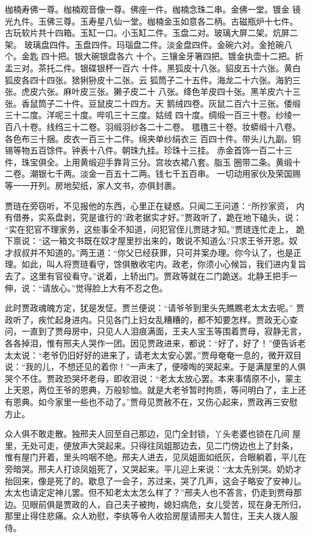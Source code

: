 枷楠寿佛一尊。枷楠观音像一尊。佛座一件。枷楠念珠二串。金佛一堂。镀金
镜光九件。玉佛三尊。玉寿星八仙一堂。枷楠金玉如意各二柄。古磁瓶炉十七件。
古玩软片共十四箱。玉缸一口。小玉缸二件。玉盘二对。玻璃大屏二架。炕屏二架。
玻璃盘四件。玉盘四件。玛瑙盘二件。淡金盘四件。金碗六对。金抢碗八个。金匙
四十把。银大碗银盘各六
十个。三镶金牙箸四把。镀金执壶十二把。折盂三对。茶托二件。银碟银杯一百六
十件。黑狐皮十八张。貂皮五十六张。黄白狐皮各四十四张。猞猁狲皮十二张。云
狐筒子二十五件。海龙二十六张。海豹三张。虎皮六张。麻叶皮三张。獭子皮二十
八张。绛色羊皮四十张。黑羊皮六十三张。香鼠筒子二十件。豆鼠皮二十四方。天
鹅绒四卷。灰鼠二百六十三张。倭缎三十二度。洋呢三十度。哔叽三十三度。姑绒
四十度。绸缎一百三十卷。纱绫一百八十卷。线绉三十二卷。羽缎羽纱各二十二卷。
氆氇三十卷。妆蟒缎十八卷。各色布三十捆。皮衣一百三十二件。绵夹单纱绢衣三
百四十件。带头儿九副。铜锡等物五百馀件。钟表十八件。朝珠九挂。珍珠十三挂。
赤金首饰一百二十三件，珠宝俱全。上用黄缎迎手靠背三分。宫妆衣裙八套。脂玉
圈带二条。黄缎十二卷。潮银七千两。淡金一百五十二两。钱七千五百串。
一切动用家伙及荣国赐等一一开列。房地契纸，家人文书，亦俱封裹。

贾琏在旁窃听，不见报他的东西，心里正在疑惑。只闻二王问道：“所抄家资，
内有借券，实系盘剥，究是谁行的?政老据实才好。”贾政听了，跪在地下磕头，说：
“实在犯官不理家务，这些事全不知道，问犯官侄儿贾琏才知。”贾琏连忙走上，
跪下禀说：“这一箱文书既在奴才屋里抄出来的，敢说不知道么?只求王爷开恩。奴
才叔叔并不知道的。”两王道：“你父已经获罪，只可并案办理。你今认了，也是正
理。如此，叫人将贾琏看守，馀俱散收宅内。政老，你须小心候旨，我们进内复旨
去了。这里有官役看守。”说着，上轿出门。贾政等就在二门跪送。北静王把手一
伸，说：“请放心。”觉得脸上大有不忍之色。

此时贾政魂魄方定，犹是发怔。贾兰便说：“请爷爷到里头先瞧瞧老太太去呢。”
贾政听了，疾忙起身进内。只见各门上妇女乱糟糟的，都不知要怎样。贾政无心查
问，一直到了贾母房中，只见人人泪痕满面，王夫人宝玉等围着贾母，寂静无言，
各各掉泪，惟有邢夫人哭作一团。因见贾政进来，都说：“好了，好了！”便告诉老
太太说：“老爷仍旧好好的进来了，请老太太安心罢。”贾母奄奄一息的，微开双目
说：“我的儿，不想还见的着你！”一声未了，便嚎啕的哭起来。于是满屋里的人俱
哭个不住。贾政恐哭坏老母，即收泪说：“老太太放心罢。本来事情原不小，蒙主
上天恩，两位王爷的恩典，万般轸恤。就是大老爷暂时拘质，等问明白了，主上还
有恩典。如今家里一些也不动了。”贾母见贾赦不在，又伤心起来，贾政再三安慰
方止。

众人俱不敢走散。独邢夫人回至自己那边，见门全封锁，丫头老婆也锁在几间
屋里，无处可走，便放声大哭起来。只得往凤姐那边去，见二门傍边也上了封条，
惟有屋门开着，里头呜咽不绝。邢夫人进去，见凤姐面如纸灰，合眼躺着，平儿在
旁暗哭。邢夫人打谅凤姐死了，又哭起来。平儿迎上来说：“太太先别哭。奶奶才
抬回来，像是死了的。歇息了一会子，苏过来，哭了几声，这会子略安了安神儿。
太太也请定定神儿罢。但不知老太太怎么样了？”邢夫人也不答言，仍走到贾母那
边。见眼前俱是贾政的人，自己夫子被拘，媳妇病危，女儿受苦，现在身无所归，
那里止得住悲痛。众人劝慰，李纨等令人收拾房屋请邢夫人暂住，王夫人拨人服侍。

